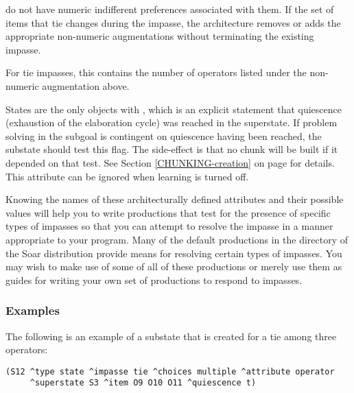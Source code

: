 \begin{description}
	do not have numeric indifferent preferences associated with them. If the
	set of items that tie changes during the impasse, the architecture
	removes or adds the appropriate non-numeric augmentations without
	terminating the existing impasse.
	\vspace{-8pt}
\item [\soar{\carat non-numeric-count}] For tie impasses, this contains the number of 
	operators listed under the non-numeric augmentation above.
	\vspace{-8pt}
\item [\soar{\carat quiescence}] States are the only objects with , 
	which is an explicit statement that quiescence (exhaustion of the elaboration cycle) 
	was reached in the superstate.  If problem solving in the subgoal is contingent on 
	quiescence having been reached, the substate should test this flag. The side-effect 
	is that no chunk will be built if it depended on that test. 
	See Section \ref{CHUNKING-creation} on page \pageref{CHUNKING-creation} for
	details. This attribute can be ignored when learning is turned off.
\end{description} 

Knowing the names of these architecturally defined attributes and their
possible values will help you to write productions that test for the presence
of specific types of impasses so that you can attempt to resolve the impasse
in a manner appropriate to your program. Many of the default
productions in the  directory of the Soar distribution
 provide means for resolving
certain types of impasses. You may wish to make use of some of all of these
productions or merely use them as guides for writing your own set of
productions to respond to impasses.

\subsubsection*{Examples}


The following is an example of a substate that is created for a tie among
three operators:
\begin{verbatim}
(S12 ^type state ^impasse tie ^choices multiple ^attribute operator 
     ^superstate S3 ^item O9 O10 O11 ^quiescence t)
\end{verbatim} \vspace{12pt}


